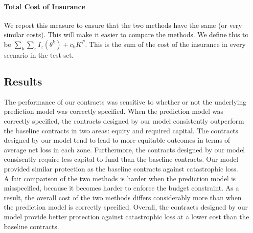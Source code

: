 \documentclass[11pt]{article}
\begin{document}
    \paragraph*{Total Cost of Insurance} We report this measure to ensure that the two methods have the same (or very similar costs). This will make it easier to compare the methods. We define this to be $\sum_k \sum_z I_z(\theta^k) + c_kK^P$. This is the sum of the cost of the insurance in every scenario in the test set. 

  \subsection{Results}
  The performance of our contracts was sensitive to whether or not the underlying prediction model was correctly specified. When the prediction model was correctly specified, the contracts designed by our model consistently outperform the baseline contracts in two areas: equity and required capital. The contracts designed by our model tend to lead to more equitable outcomes in terms of average net loss in each zone. Furthermore, the contracts designed by our model consisently require less capital to fund than the baseline contracts. Our model provided similar protection as the baseline contracts against catastrophic loss. \\
  A fair comparison of the two methods is harder when the prediction model is misspecified, because it becomes harder to enforce the budget constraint. As a result, the overall cost of the two methods differs considerably more than when the prediction model is correctly specified. Overall, the contracts designed by our model provide better protection against catastrophic loss at a lower cost than the baseline contracts. 
\end{document}

